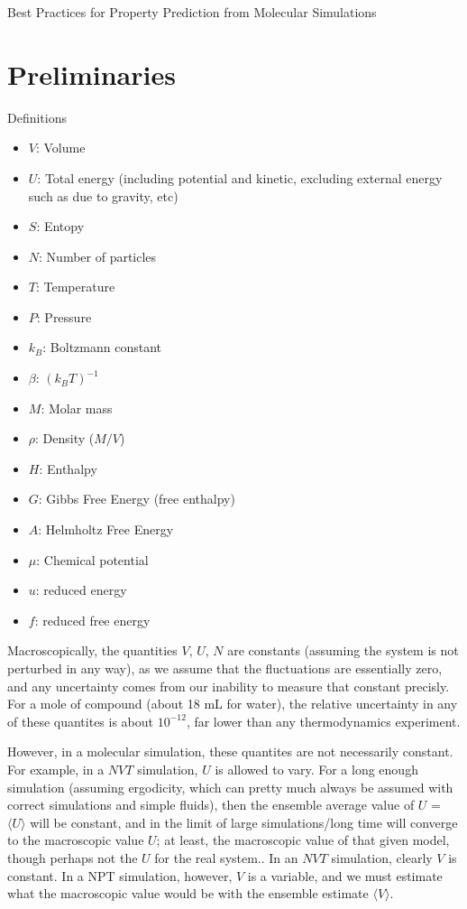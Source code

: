 \documentclass[a4paper,12pt]{article}
\begin{document}
{\large Best Practices for Property Prediction from Molecular Simulations}

\section{Preliminaries}
Definitions
\begin{itemize}
\item $V$: Volume
\item $U$: Total energy (including potential and kinetic, excluding external energy such as due to gravity, etc)
\item $S$: Entopy
\item $N$: Number of particles
\item $T$: Temperature
\item $P$: Pressure
\item $k_B$: Boltzmann constant
\item $\beta$: $(k_B T)^{-1}$
\item $M$: Molar mass
\item $\rho$: Density ($M/V$)
\item $H$: Enthalpy 
\item $G$: Gibbs Free Energy (free enthalpy)
\item $A$: Helmholtz Free Energy
\item $\mu$: Chemical potential
\item $u$: reduced energy
\item $f$: reduced free energy
\end{itemize}
Macroscopically, the quantities $V$, $U$, $N$ are constants (assuming
the system is not perturbed in any way), as we assume that the
fluctuations are essentially zero, and any uncertainty comes from our
inability to measure that constant precisly. For a mole of compound
(about 18 mL for water), the relative uncertainty in any of these
quantites is about $10^{-12}$, far lower than any thermodynamics
experiment.

However, in a molecular simulation, these quantites are not
necessarily constant. For example, in a $NVT$ simulation, $U$ is
allowed to vary.  For a long enough simulation (assuming ergodicity,
which can pretty much always be assumed with correct simulations and
simple fluids), then the ensemble average value of $U$ = $\langle U
\rangle$ will be constant, and in the limit of large simulations/long
time will converge to the macroscopic value $U$; at least, the
macroscopic value of that given model, though perhaps not the $U$ for
the real system..  In an $NVT$ simulation, clearly $V$ is constant.
In a NPT simulation, however, $V$ is a variable, and we must estimate
what the macroscopic value would be with the ensemble estimate
$\langle V \rangle$.
\end{document}
